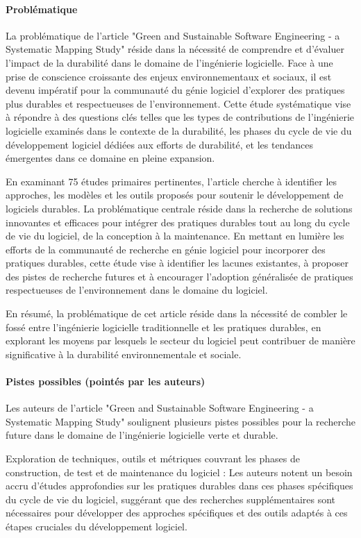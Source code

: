 \paragraph{Problématique}
La problématique de l'article "Green and Sustainable Software Engineering - a Systematic Mapping Study" réside dans la nécessité de comprendre et d'évaluer l'impact de la durabilité dans le domaine de l'ingénierie logicielle. Face à une prise de conscience croissante des enjeux environnementaux et sociaux, il est devenu impératif pour la communauté du génie logiciel d'explorer des pratiques plus durables et respectueuses de l'environnement. Cette étude systématique vise à répondre à des questions clés telles que les types de contributions de l'ingénierie logicielle examinés dans le contexte de la durabilité, les phases du cycle de vie du développement logiciel dédiées aux efforts de durabilité, et les tendances émergentes dans ce domaine en pleine expansion.

En examinant 75 études primaires pertinentes, l'article cherche à identifier les approches, les modèles et les outils proposés pour soutenir le développement de logiciels durables. La problématique centrale réside dans la recherche de solutions innovantes et efficaces pour intégrer des pratiques durables tout au long du cycle de vie du logiciel, de la conception à la maintenance. En mettant en lumière les efforts de la communauté de recherche en génie logiciel pour incorporer des pratiques durables, cette étude vise à identifier les lacunes existantes, à proposer des pistes de recherche futures et à encourager l'adoption généralisée de pratiques respectueuses de l'environnement dans le domaine du logiciel.

En résumé, la problématique de cet article réside dans la nécessité de combler le fossé entre l'ingénierie logicielle traditionnelle et les pratiques durables, en explorant les moyens par lesquels le secteur du logiciel peut contribuer de manière significative à la durabilité environnementale et sociale.

\paragraph{Pistes possibles (pointés par les auteurs)}
Les auteurs de l'article "Green and Sustainable Software Engineering - a Systematic Mapping Study" soulignent plusieurs pistes possibles pour la recherche future dans le domaine de l'ingénierie logicielle verte et durable.

Exploration de techniques, outils et métriques couvrant les phases de construction, de test et de maintenance du logiciel : Les auteurs notent un besoin accru d'études approfondies sur les pratiques durables dans ces phases spécifiques du cycle de vie du logiciel, suggérant que des recherches supplémentaires sont nécessaires pour développer des approches spécifiques et des outils adaptés à ces étapes cruciales du développement logiciel.

